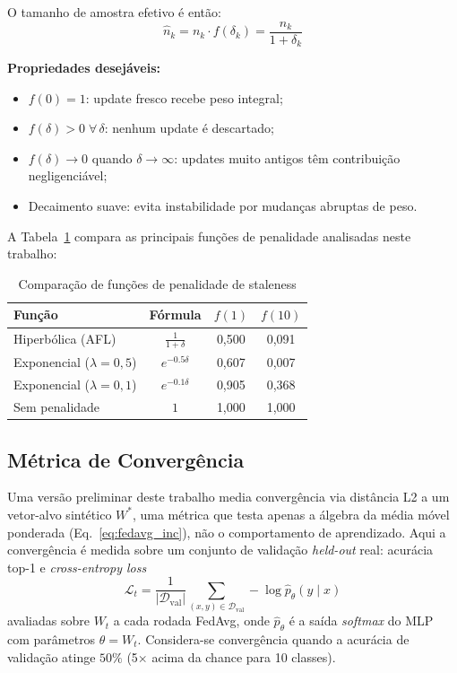 \documentclass[conference,a4paper]{IEEEtran}
\begin{document}
O tamanho de amostra efetivo é então:
\begin{equation}
\hat{n}_k = n_k \cdot f(\delta_k) = \frac{n_k}{1 + \delta_k}
\label{eq:effective_nk}
\end{equation}

\noindent \textbf{Propriedades desejáveis:}
\begin{itemize}[noitemsep,leftmargin=*]
  \item $f(0) = 1$: update fresco recebe peso integral;
  \item $f(\delta) > 0\; \forall\, \delta$: nenhum update é descartado;
  \item $f(\delta) \to 0$ quando $\delta \to \infty$: updates muito antigos
        têm contribuição negligenciável;
  \item Decaimento suave: evita instabilidade por mudanças abruptas de peso.
\end{itemize}

A Tabela~\ref{tab:staleness_compare} compara as principais funções de
penalidade analisadas neste trabalho:

\begin{table}[H]
\centering
\caption{Comparação de funções de penalidade de staleness}
\label{tab:staleness_compare}
\small
\begin{tabular}{@{}lccc@{}}
\toprule
\textbf{Função} & \textbf{Fórmula} & $f(1)$ & $f(10)$ \\
\midrule
Hiperbólica (AFL) & $\frac{1}{1+\delta}$ & 0,500 & 0,091 \\
Exponencial ($\lambda{=}0{,}5$) & $e^{-0.5\delta}$ & 0,607 & 0,007 \\
Exponencial ($\lambda{=}0{,}1$) & $e^{-0.1\delta}$ & 0,905 & 0,368 \\
Sem penalidade & $1$ & 1,000 & 1,000 \\
\bottomrule
\end{tabular}
\end{table}

\subsection{Métrica de Convergência}

Uma versão preliminar deste trabalho media
convergência via distância L2 a um vetor-alvo sintético $W^*$, uma métrica
que testa apenas a álgebra da média móvel ponderada (Eq.~\ref{eq:fedavg_inc}),
não o comportamento de aprendizado. Aqui a convergência é medida sobre um
conjunto de validação \textit{held-out} real: acurácia top-1 e
\textit{cross-entropy loss}
\begin{equation}
\mathcal{L}_t = \frac{1}{|\mathcal{D}_{\text{val}}|}
  \sum_{(x,y) \in \mathcal{D}_{\text{val}}}
  -\log \hat{p}_\theta(y \mid x)
\label{eq:ce_loss}
\end{equation}
avaliadas sobre $W_t$ a cada rodada FedAvg, onde $\hat{p}_\theta$ é a saída
\textit{softmax} do MLP com parâmetros $\theta = W_t$. Considera-se
convergência quando a acurácia de validação atinge $50\%$ (5$\times$ acima da
chance para 10 classes).
\end{document}
